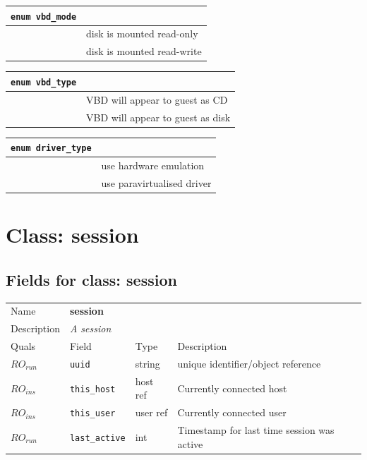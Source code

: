 \vspace{1cm}
\begin{longtable}{|ll|}
\hline
{\tt enum vbd\_mode} & \\
\hline
\hspace{0.5cm}{\tt RO} & disk is mounted read-only \\
\hspace{0.5cm}{\tt RW} & disk is mounted read-write \\
\hline
\end{longtable}

\vspace{1cm}
\begin{longtable}{|ll|}
\hline
{\tt enum vbd\_type} & \\
\hline
\hspace{0.5cm}{\tt CD} & VBD will appear to guest as CD \\
\hspace{0.5cm}{\tt Disk} & VBD will appear to guest as disk \\
\hline
\end{longtable}

\vspace{1cm}
\begin{longtable}{|ll|}
\hline
{\tt enum driver\_type} & \\
\hline
\hspace{0.5cm}{\tt ioemu} & use hardware emulation \\
\hspace{0.5cm}{\tt paravirtualised} & use paravirtualised driver \\
\hline
\end{longtable}

\vspace{1cm}

\newpage
\section{Class: session}
\subsection{Fields for class: session}
\begin{longtable}{|lllp{}|}
\hline
\multicolumn{1}{|l}{Name} & \multicolumn{3}{l|}{\bf session} \\
\multicolumn{1}{|l}{Description} & \multicolumn{3}{l|}{\parbox{11cm}{\em A session}} \\
\hline
Quals & Field & Type & Description \\
\hline
$\mathit{RO}_\mathit{run}$ &  {\tt uuid} & string & unique identifier/object reference \\
$\mathit{RO}_\mathit{ins}$ &  {\tt this\_host} & host ref & Currently connected host \\
$\mathit{RO}_\mathit{ins}$ &  {\tt this\_user} & user ref & Currently connected user \\
$\mathit{RO}_\mathit{run}$ &  {\tt last\_active} & int & Timestamp for last time session was active \\
\hline
\end{longtable}
